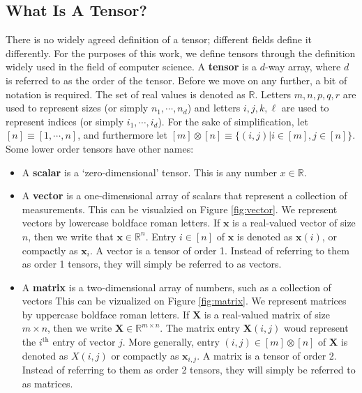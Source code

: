 
\subsection{What Is A Tensor?} \label{sec:What is A Tensor} There is no widely
    agreed definition of a tensor; different fields define it differently. For
    the purposes of this work, we define tensors through the definition widely
    used in the field of computer science. A \textbf{tensor} is a $d$-way
    array, where $d$ is referred to as the order of the tensor. Before we move
    on any further, a bit of notation is required. The set of real values is
    denoted as $\mathbb{R}$. Letters $m, n, p, q, r$ are used to represent sizes
    (or simply $n_1, \cdots, n_d$) and letters $i, j, k, \ell$ are used to
    represent indices (or simply $i_1, \cdots, i_d$). For the sake of
    simplification, let $[n] \equiv [1, \cdots, n]$, and furthermore let $[m]
    \otimes [n] \equiv \{ (i, j) | i\in[m], j\in[n]\}$. Some lower order tensors
    have other names:


    \begin{itemize}
        \item A \textbf{scalar} is a `zero-dimensional' tensor. This is any
        number $x\in \mathbb{R}$. 
        \item A \textbf{vector} is a one-dimensional array of scalars that
        represent a collection of measurements. This can be visualzied on Figure
        \ref{fig:vector}. We represent vectors by lowercase boldface roman
        letters. If $\mathbf{x}$ is a real-valued vector of size $n$, then we
        write that $\mathbf{x} \in \mathbb{R}^n$. Entry $i\in [n]$ of
        $\mathbf{x}$ is denoted as $\mathbf{x}(i)$, or compactly as
        $\mathbf{x}_i$. A vector is a tensor of order 1. Instead of referring to
        them as order 1 tensors, they will simply be referred to as vectors. 
        \item A \textbf{matrix} is a two-dimensional array of numbers, such
        as a collection of vectors This can be vizualized on Figure
        \ref{fig:matrix}. We represent matrices by uppercase boldface roman
        letters. If $\mathbf{X}$ is a real-valued matrix of size $m\times
        n$, then we write $\mathbf{X}\in \mathbb{R}^{m\times n}$. The matrix
        entry $\mathbf{X}(i, j)$ woud represent the $i^\text{th}$ entry of
        vector $j$. More generally, entry $(i, j)\in [m] \otimes [n]$ of
        $\mathbf{X}$ is denoted as $X(i, j)$ or compactly as $\mathbf{x}_{i,
        j}$. A matrix is a tensor of order 2. Instead of referring to
        them as order 2 tensors, they will simply be referred to as matrices.
    \end{itemize}


